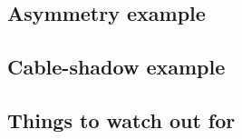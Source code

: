 \documentclass[green, 12pt]{beamer}
\begin{document}
\subsection{Asymmetry example}
  

\subsection{Cable-shadow example}
  

\subsection{Things to watch out for}
  

%  

%  
%  

%  

%  

%  

%  
%  
%  
\end{document}
